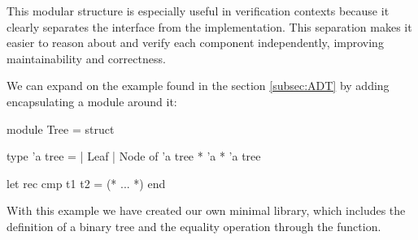 This modular structure is especially useful in verification contexts because it clearly separates the interface from the 
implementation. This separation makes it easier to reason about and verify each component independently, improving 
maintainability and correctness.

We can expand on the example found in the section \ref{subsec:ADT} by adding encapsulating a module around it:

\begin{ocamlenv}
module Tree = struct

  type 'a tree =
    | Leaf
    | Node of 'a tree * 'a * 'a tree

  let rec cmp t1 t2 = (* ... *)
end
\end{ocamlenv}

With this example we have created our own minimal  library, which includes the definition of a binary tree and the equality 
operation through the  function.




